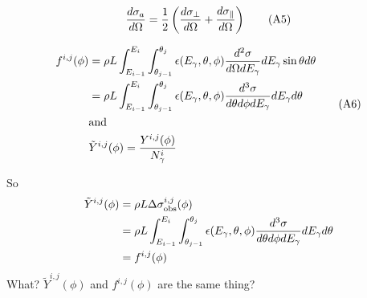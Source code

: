 \documentclass{article}
\begin{document}
\begin{equation}
{d\sigma_a \over d\Omega} = {1 \over 2} \left( {d\sigma_\perp \over d\Omega} + {d\sigma_\parallel \over d\Omega} \right) \tag{A5} \\
\end{equation}

\begin{equation}
  \begin{split}
f^{i,j}(\phi) & = \rho L\int^{E_i}_{E_{i-1}}\int_{\theta_{j-1}}^{\theta_j} \epsilon(E_\gamma,\theta,\phi) {d^2\sigma \over d\Omega dE_\gamma} dE_\gamma \sin\theta d\theta \\
& = \rho L\int^{E_i}_{E_{i-1}}\int_{\theta_{j-1}}^{\theta_j} \epsilon(E_\gamma,\theta,\phi) {d^3\sigma \over d\theta d\phi dE_\gamma} dE_\gamma d\theta \\
& {\rm and} \\
& \tilde Y^{i,j}(\phi) = {Y^{i,j}(\phi) \over N^i_\gamma}
\end{split} \tag{A6}
\end{equation}

So
\begin{equation}
  \begin{split}
    \tilde Y^{i,j}(\phi) & = \rho L\Delta\sigma^{i,j}_{\rm obs}(\phi) \\
    & = \rho L\int^{E_i}_{E_{i-1}}\int_{\theta_{j-1}}^{\theta_j} \epsilon(E_\gamma,\theta,\phi) {d^3\sigma \over d\theta d\phi dE_\gamma} dE_\gamma d\theta \\
    & = f^{i,j}(\phi)
  \end{split}
\end{equation}
What? $\tilde Y^{i,j}(\phi)$ and $f^{i,j}(\phi)$ are the same thing?
\end{document}
